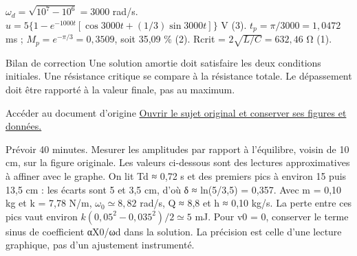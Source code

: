 $\omega_d=\sqrt{10^7-10^6}=3000$ rad/s. $u=5\{1-e^{-1000t}[\cos3000t+(1/3)\sin3000t]\}$ V (3). $t_p=\pi/3000=1{,}0472$ ms ; $M_p=e^{-\pi/3}=0{,}3509$, soit 35,09 \% (2). Rcrit = $2\sqrt{L/C}=632{,}46$ Ω (1).
\begin{methode}{Bilan de correction}
Une solution amortie doit satisfaire les deux conditions initiales. Une résistance critique se compare à la résistance totale. Le dépassement doit être rapporté à la valeur finale, pas au maximum.
\end{methode}


\begin{loi}{Accéder au document d’origine}
\href{https://cahier-de-prepa.fr/mp*-condorcet/download?id=98&v=66f32}{Ouvrir le sujet original et conserver ses figures et données.}
\end{loi}
Prévoir 40 minutes. Mesurer les amplitudes par rapport à l’équilibre, voisin de 10 cm, sur la figure originale. Les valeurs ci-dessous sont des lectures approximatives à affiner avec le graphe.
On lit Td ≈ 0,72 s et des premiers pics à environ 15 puis 13,5 cm : les écarts sont 5 et 3,5 cm, d’où δ ≈ ln(5/3,5) = 0,357. Avec m = 0,10 kg et k = 7,78 N/m, $\omega_0\simeq8{,}82$ rad/s, Q ≈ 8,8 et h ≈ 0,10 kg/s. La perte entre ces pics vaut environ $k(0{,}05^2-0{,}035^2)/2\simeq5$ mJ. Pour v0 = 0, conserver le terme sinus de coefficient αX0/ωd dans la solution. La précision est celle d’une lecture graphique, pas d’un ajustement instrumenté.

